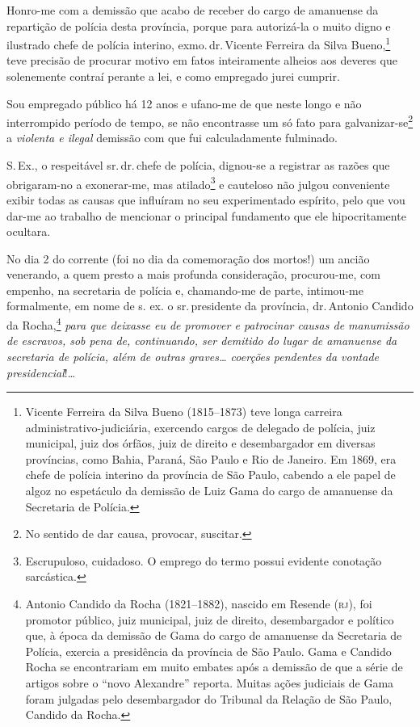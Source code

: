 Honro-me com a demissão que acabo de receber do cargo de amanuense da
repartição de polícia desta província, porque para autorizá-la o muito
digno e ilustrado chefe de polícia interino, exmo.\,dr.\,Vicente Ferreira
da Silva Bueno,\footnote{Vicente Ferreira da Silva Bueno (1815--1873)
  teve longa carreira administrativo-judiciária, exercendo cargos de
  delegado de polícia, juiz municipal, juiz dos órfãos, juiz de direito
  e desembargador em diversas províncias, como Bahia, Paraná, São Paulo
  e Rio de Janeiro. Em 1869, era chefe de polícia interino da província
  de São Paulo, cabendo a ele papel de algoz no espetáculo da demissão
  de Luiz Gama do cargo de amanuense da Secretaria de Polícia.} teve
precisão de procurar motivo em fatos inteiramente alheios aos deveres
que solenemente contraí perante a lei, e como empregado jurei cumprir.

Sou empregado público há 12 anos e ufano-me de que neste longo e não
interrompido período de tempo, se não encontrasse um só fato para
galvanizar-se\footnote{No sentido de dar causa, provocar, suscitar.} a
\emph{violenta e ilegal} demissão com que fui calculadamente fulminado.

S.\,Ex., o respeitável sr.\,dr.\,chefe de polícia, dignou-se a registrar as
razões que obrigaram-no a exonerar-me, mas atilado\footnote{
  Escrupuloso, cuidadoso. O emprego do termo possui evidente conotação
  sarcástica.} e cauteloso não julgou conveniente exibir todas as causas
que influíram no seu experimentado espírito, pelo que vou dar-me ao
trabalho de mencionar o principal fundamento que ele hipocritamente
ocultara.

No dia 2 do corrente (foi no dia da comemoração dos mortos!) um ancião
venerando, a quem presto a mais profunda consideração, procurou-me, com
empenho, na secretaria de polícia e, chamando-me de parte, intimou-me
formalmente, em nome de s. ex. o sr.\,presidente da província, dr.\,Antonio Candido da Rocha,\footnote{Antonio Candido da Rocha
  (1821--1882), nascido em Resende (\textsc{rj}), foi promotor público, juiz
  municipal, juiz de direito, desembargador e político que, à época da
  demissão de Gama do cargo de amanuense da Secretaria de Polícia,
  exercia a presidência da província de São Paulo. Gama e Candido Rocha
  se encontrariam em muito embates após a demissão de que a série de
  artigos sobre o ``novo Alexandre'' reporta. Muitas ações judiciais de
  Gama foram julgadas pelo desembargador do Tribunal da Relação de São
  Paulo, Candido da Rocha.} \emph{para que deixasse eu de promover e
patrocinar causas de manumissão de escravos, sob pena de, continuando,
ser demitido do lugar de amanuense da secretaria de polícia, além de
outras graves\ldots{} coerções pendentes da vontade presidencial}!\ldots{}

